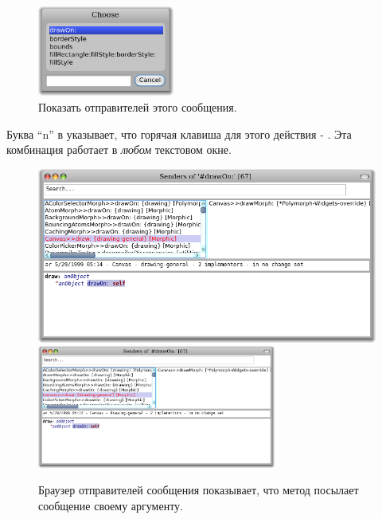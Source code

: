 \documentclass[a4paper,10pt,twoside]{book}
\begin{document}
\begin{figure}[htb]
\centerline {\includegraphics[width=0.4\textwidth]{SendersOfDrawOn2}}
\caption{Показать отправителей этого сообщения.}
\end{figure}


Буква ``n'' в  указывает, что горячая клавиша для этого действия - . Эта комбинация работает в \emph{любом} текстовом окне.



\begin{figure}[htbp]
	\begin{center}
   \ifluluelse
		{\includegraphics[width=\textwidth]{CanvasDraw}}
		{\includegraphics[width=0.7\textwidth]{CanvasDraw}}
	\end{center}
	\caption{Браузер отправителей сообщения показывает, что метод  посылает сообщение  своему аргументу.	}
\end{figure}
\end{document}
